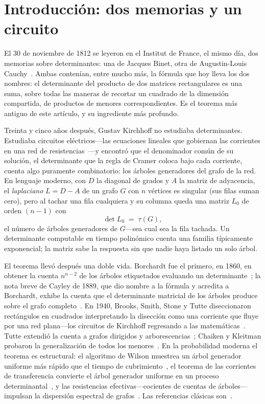\documentclass[11pt]{article}
\begin{document}
\section{Introducci\'on: dos memorias y un circuito}
\label{sec:intro}

El 30 de noviembre de 1812 se leyeron en el Institut de France, el mismo d\'ia, dos memorias
sobre determinantes: una de Jacques Binet, otra de Augustin-Louis
Cauchy~\cite{Binet1812,Cauchy1812}. Ambas conten\'ian, entre mucho m\'as, la f\'ormula que hoy
lleva los dos nombres: el determinante del producto de dos matrices rectangulares es una suma,
sobre todas las maneras de recortar un cuadrado de la dimensi\'on compartida, de productos de
menores correspondientes. Es el teorema m\'as antiguo de este art\'iculo, y su ingrediente m\'as
profundo.

Treinta y cinco a\~nos despu\'es, Gustav Kirchhoff no estudiaba determinantes. Estudiaba
circuitos el\'ectricos---las ecuaciones lineales que gobiernan las corrientes en una red de
resistencias~\cite{Kirchhoff1847}---y encontr\'o que el denominador com\'un de su soluci\'on,
el determinante que la regla de Cramer coloca bajo cada corriente, cuenta algo puramente
combinatorio: los \'arboles generadores del grafo de la red. En lenguaje
moderno, con $D$ la diagonal de grados y $A$ la matriz de adyacencia, el \emph{laplaciano}
$L=D-A$ de un grafo $G$ con $n$ v\'ertices es singular (sus filas suman cero), pero al tachar
una fila cualquiera y su columna queda una matriz $L_0$ de orden $(n-1)$ con
\[
  \det L_0 \;=\; \tau(G),
\]
el n\'umero de \'arboles generadores de $G$---sea cual sea la fila tachada. Un determinante
computable en tiempo polin\'omico cuenta una familia t\'ipicamente exponencial; la matriz sabe
la respuesta sin que nadie haya listado un solo \'arbol.

El teorema llev\'o despu\'es una doble vida. Borchardt fue el primero, en 1860, en obtener la
cuenta $n^{n-2}$ de los \'arboles etiquetados evaluando un determinante~\cite{Borchardt1860};
la nota breve de Cayley de 1889, que dio nombre a la f\'ormula y acredita a Borchardt, exhibe
la cuenta que el determinante matricial de los \'arboles produce sobre el grafo
completo~\cite{Cayley1889}. En 1940, Brooks, Smith, Stone y Tutte diseccionaron rect\'angulos
en cuadrados interpretando la disecci\'on como una corriente que fluye por una red
plana---los circuitos de Kirchhoff regresando a las matem\'aticas~\cite{BSST1940}. Tutte
extendi\'o la cuenta a grafos dirigidos y arborescencias~\cite{Tutte1948}; Chaiken y Kleitman
probaron la generalizaci\'on de todos los menores~\cite{ChaikenKleitman1978,Chaiken1982}. En la
probabilidad moderna el teorema es estructural: el algoritmo de Wilson muestrea un \'arbol
generador uniforme m\'as r\'apido que el tiempo de cubrimiento~\cite{Wilson1996}, el teorema de
las corrientes de transferencia convierte el \'arbol generador uniforme en un proceso
determinantal~\cite{BurtonPemantle1993}, y las resistencias efectivas---cocientes de cuentas de
\'arboles---impulsan la dispersi\'on espectral de grafos~\cite{SpielmanSrivastava2011}. Las
referencias cl\'asicas son~\cite{Moon1970,Biggs1993,GodsilRoyle,StanleyEC2,LyonsPeres}.
\end{document}
